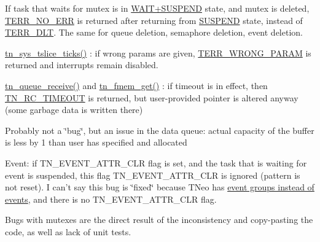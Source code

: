 \begin{DoxyItemize}
\item If task that waits for mutex is in \hyperlink{tn__tasks_8h_a5e12e8a0ab280b515f44bf3fee1210a6ad010070ccc16a5c706c286baf2e3ee2a}{{\ttfamily W\+A\+I\+T+\+S\+U\+S\+P\+E\+N\+D}} state, and mutex is deleted, {\ttfamily \hyperlink{tn__oldsymbols_8h_a71970f860643e62fad7ec03076bdc1d8}{T\+E\+R\+R\+\_\+\+N\+O\+\_\+\+E\+R\+R}} is returned after returning from \hyperlink{tn__tasks_8h_a5e12e8a0ab280b515f44bf3fee1210a6adcf21b28920038f38cccc50fda12ba58}{{\ttfamily S\+U\+S\+P\+E\+N\+D}} state, instead of {\ttfamily \hyperlink{tn__oldsymbols_8h_ae6a83c118d209d8702c3fc40d58ea18f}{T\+E\+R\+R\+\_\+\+D\+L\+T}}. The same for queue deletion, semaphore deletion, event deletion.
\item {\ttfamily \hyperlink{tn__oldsymbols_8h_a74b0cfd9bbf5a85f4e0d00a984f60f5e}{tn\+\_\+sys\+\_\+tslice\+\_\+ticks()}} \+: if wrong params are given, {\ttfamily \hyperlink{tn__oldsymbols_8h_a35ec519d54f884d84c5814f49f00a22b}{T\+E\+R\+R\+\_\+\+W\+R\+O\+N\+G\+\_\+\+P\+A\+R\+A\+M}} is returned and interrupts remain disabled.
\item {\ttfamily \hyperlink{tn__dqueue_8h_ab47ed49af7dffc5a71eaabd25422d0e4}{tn\+\_\+queue\+\_\+receive()}} and {\ttfamily \hyperlink{tn__fmem_8h_a2ecd094041dbd0e92d61b852b7952444}{tn\+\_\+fmem\+\_\+get()}} \+: if {\ttfamily timeout} is in effect, then {\ttfamily \hyperlink{tn__common_8h_aa43bd3da1ad4c1e61224b5f23b369876a5b4d73fde6b5d1c9579c02e6aafce1fb}{T\+N\+\_\+\+R\+C\+\_\+\+T\+I\+M\+E\+O\+U\+T}} is returned, but user-\/provided pointer is altered anyway (some garbage data is written there)
\item Probably not a \char`\"{}bug\char`\"{}, but an issue in the data queue\+: actual capacity of the buffer is less by 1 than user has specified and allocated
\item Event\+: if {\ttfamily T\+N\+\_\+\+E\+V\+E\+N\+T\+\_\+\+A\+T\+T\+R\+\_\+\+C\+L\+R} flag is set, and the task that is waiting for event is suspended, this flag {\ttfamily T\+N\+\_\+\+E\+V\+E\+N\+T\+\_\+\+A\+T\+T\+R\+\_\+\+C\+L\+R} is ignored (pattern is not reset). I can't say this bug is \char`\"{}fixed\char`\"{} because T\+Neo has \hyperlink{tnkernel_diff_tnkernel_diff_event}{event groups instead of events}, and there is no {\ttfamily T\+N\+\_\+\+E\+V\+E\+N\+T\+\_\+\+A\+T\+T\+R\+\_\+\+C\+L\+R} flag.
\end{DoxyItemize}

Bugs with mutexes are the direct result of the inconsistency and copy-\/pasting the code, as well as lack of unit tests. 